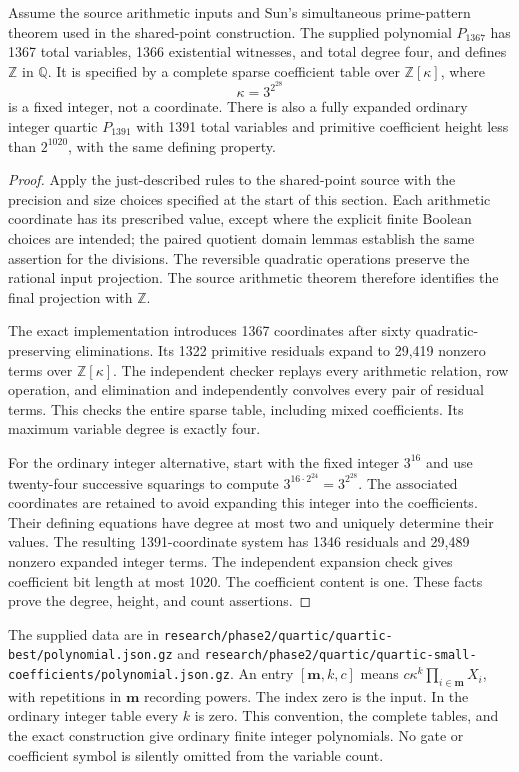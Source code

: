 \begin{theorem}\label{thm:quartic-1367}
Assume the source arithmetic inputs and Sun's simultaneous prime-pattern
theorem used in the shared-point construction.  The supplied polynomial
$P_{1367}$ has 1367 total variables, 1366 existential witnesses, and total
degree four, and defines $\mathbb Z$ in $\mathbb Q$.  It is specified by
a complete sparse coefficient table over $\mathbb Z[\kappa]$, where
\[
                         \kappa=3^{2^{28}}
\]
is a fixed integer, not a coordinate.  There is also a fully expanded
ordinary integer quartic $P_{1391}$ with 1391 total variables and primitive
coefficient height less than $2^{1020}$, with the same defining property.
\end{theorem}
\begin{proof}
Apply the just-described rules to the shared-point source with the
precision and size choices specified at the start of this section.
Each arithmetic coordinate has its prescribed value, except where the
explicit finite Boolean choices are intended; the paired quotient domain
lemmas establish the same assertion for the divisions.  The reversible
quadratic operations preserve the rational input projection.  The source
arithmetic theorem therefore identifies the final projection with
$\mathbb Z$.

The exact implementation introduces 1367 coordinates after sixty
quadratic-preserving eliminations.  Its 1322 primitive residuals expand
to 29,419 nonzero terms over $\mathbb Z[\kappa]$.  The independent checker
replays every arithmetic relation, row operation, and elimination and
independently convolves every pair of residual terms.  This checks the
entire sparse table, including mixed coefficients.  Its maximum variable
degree is exactly four.

For the ordinary integer alternative, start with the fixed integer
$3^{16}$ and use twenty-four successive squarings to compute
$3^{16\cdot2^{24}}=3^{2^{28}}$.  The associated coordinates are retained
to avoid expanding this integer into the coefficients.  Their defining
equations have degree at most two and uniquely determine their values.
The resulting 1391-coordinate system has 1346 residuals and 29,489
nonzero expanded integer terms.  The independent expansion check gives
coefficient bit length at most 1020.  The coefficient content is one.
These facts prove the degree, height, and count assertions.
\end{proof}

The supplied data are in
\nolinkurl{research/phase2/quartic/quartic-best/polynomial.json.gz} and
\nolinkurl{research/phase2/quartic/quartic-small-coefficients/polynomial.json.gz}.
An entry $[\mathbf m,k,c]$ means $c\kappa^k\prod_{i\in\mathbf m}X_i$,
with repetitions in $\mathbf m$ recording powers.  The index zero is the
input.  In the ordinary integer table every $k$ is zero.  This convention,
the complete tables, and the exact construction give ordinary finite
integer polynomials.  No gate or coefficient symbol is silently omitted
from the variable count.


